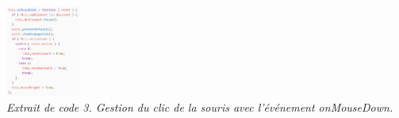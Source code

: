 \begin{center}
	\includegraphics[height=3cm]{images/code_onmousedown.eps}\\
	\textit{Extrait de code 3. Gestion du clic de la souris avec l'événement onMouseDown.}
\end{center}